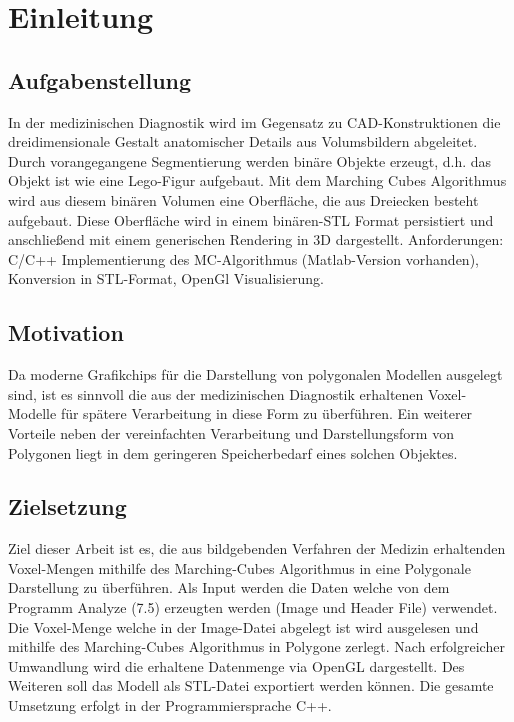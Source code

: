 \chapter{Einleitung}

\section{Aufgabenstellung}
In der medizinischen Diagnostik wird im Gegensatz zu CAD-Konstruktionen die dreidimensionale
Gestalt anatomischer Details aus Volumsbildern abgeleitet. Durch vorangegangene
Segmentierung werden binäre Objekte erzeugt, d.h. das Objekt ist wie eine Lego-Figur aufgebaut.
Mit dem Marching Cubes Algorithmus wird aus diesem binären Volumen eine Oberfläche, die aus Dreiecken besteht aufgebaut. Diese Oberfläche wird in einem binären-STL Format persistiert und anschließend mit einem generischen Rendering in 3D dargestellt.
Anforderungen: C/C++ Implementierung des MC-Algorithmus (Matlab-Version vorhanden),
Konversion in STL-Format, OpenGl Visualisierung.

\section{Motivation}
Da moderne Grafikchips für die Darstellung von polygonalen Modellen ausgelegt sind, ist es sinnvoll die aus der medizinischen Diagnostik erhaltenen Voxel-Modelle für spätere Verarbeitung in diese Form zu überführen. Ein weiterer Vorteile neben der vereinfachten Verarbeitung und Darstellungsform von Polygonen liegt in dem geringeren Speicherbedarf eines solchen Objektes.

\section{Zielsetzung}
Ziel dieser Arbeit ist es, die aus bildgebenden Verfahren der Medizin erhaltenden Voxel-Mengen mithilfe des Marching-Cubes Algorithmus in eine Polygonale Darstellung zu überführen. Als Input werden die Daten welche von dem Programm Analyze (7.5) erzeugten werden (Image und Header File) verwendet. Die Voxel-Menge welche in der Image-Datei abgelegt ist wird ausgelesen und mithilfe des Marching-Cubes Algorithmus in Polygone zerlegt. Nach erfolgreicher Umwandlung wird die erhaltene Datenmenge via OpenGL dargestellt. Des Weiteren soll das Modell als STL-Datei exportiert werden können. Die gesamte Umsetzung erfolgt in der Programmiersprache C++. 
